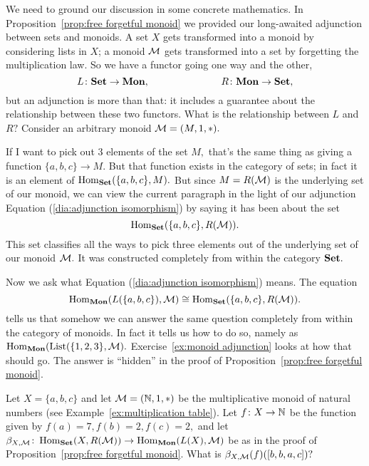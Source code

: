 \documentclass[../main/CT4S-EN-RU]{subfiles}
\begin{document}
\begin{exampleENG}
We need to ground our discussion in some concrete mathematics. In Proposition~\ref{prop:free forgetful monoid} we provided our long-awaited adjunction between sets and monoids. A set $X$ gets transformed into a monoid by considering lists in $X$; a monoid $\mathcal{M}$ gets transformed into a set by forgetting the multiplication law. So we have a functor going one way and the other, 
$$L\colon{\mathbf{Set}}\rightarrow{\mathbf{Mon}},\hspace{1in}R\colon{\mathbf{Mon}}\rightarrow{\mathbf{Set}},$$
but an adjunction is more than that: it includes a guarantee about the relationship between these two functors. What is the relationship between $L$ and $R?$ Consider an arbitrary monoid $\mathcal{M}=(M,1,*).$

If I want to pick out 3 elements of the set $M,$ that's the same thing as giving a function $\{a,b,c\}\to M.$ But that function exists in the category of sets; in fact it is an element of $\operatorname{Hom}_{\mathbf{Set}}(\{a,b,c\},M).$ But since $M=R(\mathcal{M})$ is the underlying set of our monoid, we can view the current paragraph in the light of our adjunction Equation (\ref{dia:adjunction isomorphism}) by saying it has been about the set
$$\operatorname{Hom}_{\mathbf{Set}}(\{a,b,c\},R(\mathcal{M})).$$
This set classifies all the ways to pick three elements out of the underlying set of our monoid $\mathcal{M}.$ It was constructed completely from within the category ${\mathbf{Set}}.$

Now we ask what Equation (\ref{dia:adjunction isomorphism}) means. The equation
$$\operatorname{Hom}_{\mathbf{Mon}}(L(\{a,b,c\}),\mathcal{M})\cong\operatorname{Hom}_{\mathbf{Set}}(\{a,b,c\},R(\mathcal{M})).$$
tells us that somehow we can answer the same question completely from within the category of monoids. In fact it tells us how to do so, namely as $\operatorname{Hom}_{\mathbf{Mon}}(\operatorname{List}(\{1,2,3\},\mathcal{M}).$  Exercise~\ref{ex:monoid adjunction} looks at how that should go. The answer is “hidden” in the proof of Proposition~\ref{prop:free forgetful monoid}.
\end{exampleENG}

\begin{exampleRUS}
\end{exampleRUS}

\begin{exerciseENG}\label{ex:monoid adjunction}
Let $X=\{a,b,c\}$ and let $\mathcal{M}=({\mathbb N},1,*)$ be the multiplicative monoid of natural numbers (see Example~\ref{ex:multiplication table}). Let $f\colon X\rightarrow{\mathbb N}$ be the function given by $f(a)=7, f(b)=2, f(c)=2,$ and let $\beta_{X,\mathcal{M}}\colon\operatorname{Hom}_{\mathbf{Set}}(X,R(\mathcal{M}))\rightarrow\operatorname{Hom}_{\mathbf{Mon}}(L(X),\mathcal{M})$ be as in the proof of Proposition~\ref{prop:free forgetful monoid}. What is $\beta_{X,\mathcal{M}}(f)([b,b,a,c])?$
\end{exerciseENG}
\end{document}
